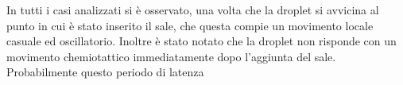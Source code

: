 In tutti i casi analizzati si è osservato, una volta che la droplet si avvicina al punto in cui è stato inserito il sale, che questa compie un movimento locale casuale ed oscillatorio.
Inoltre è stato notato che la droplet non risponde con un movimento chemiotattico immediatamente dopo l'aggiunta del sale. Probabilmente questo periodo di latenza 






















